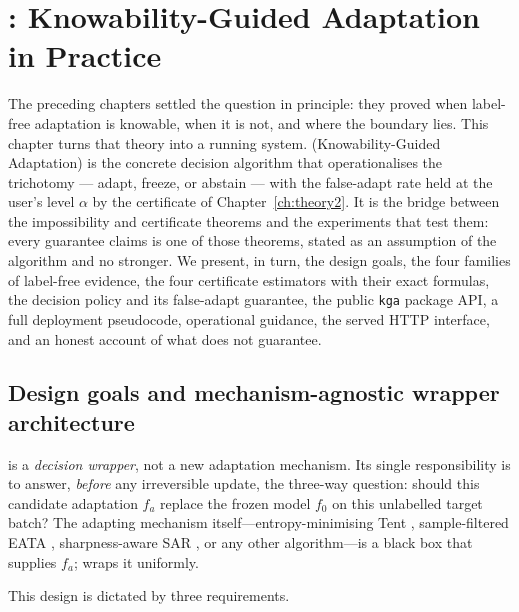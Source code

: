 \chapter{\KGA: Knowability-Guided Adaptation in Practice}\label{ch:kga}

The preceding chapters settled the question in principle: they proved when label-free
adaptation is knowable, when it is not, and where the boundary lies.  This chapter turns
that theory into a running system.  \KGA{} (Knowability-Guided Adaptation) is the concrete
decision algorithm that operationalises the trichotomy --- adapt, freeze, or abstain ---
with the false-adapt rate held at the user's level $\alpha$ by the certificate of
Chapter~\ref{ch:theory2}.  It is the bridge between the impossibility and certificate
theorems and the experiments that test them: every guarantee \KGA{} claims is one of those
theorems, stated as an assumption of the algorithm and no stronger.  We present, in turn,
the design goals, the four families of label-free evidence, the four certificate
estimators with their exact formulas, the decision policy and its false-adapt guarantee,
the public \texttt{kga} package API, a full deployment pseudocode, operational guidance,
the served HTTP interface, and an honest account of what \KGA{} does not guarantee.

\section{Design goals and mechanism-agnostic wrapper architecture}
\label{sec:kga-design}

\KGA{} is a \emph{decision wrapper}, not a new adaptation mechanism.  Its
single responsibility is to answer, \emph{before} any irreversible update, the
three-way question: should this candidate adaptation $f_a$ replace the frozen
model $f_0$ on this unlabelled target batch?  The adapting mechanism
itself---entropy-minimising Tent \cite{wang2021tent}, sample-filtered EATA
\cite{niu2022eata}, sharpness-aware SAR \cite{niu2023sar}, or any other
algorithm---is a black box that supplies $f_a$; \KGA{} wraps it uniformly.

This design is dictated by three requirements.


